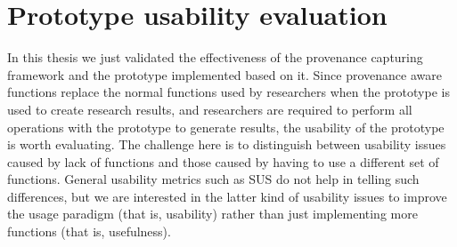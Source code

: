 \section{Prototype usability evaluation}
In this thesis we just validated the effectiveness of the provenance capturing framework and the prototype implemented based on it. Since provenance aware functions replace the normal functions used by researchers when the prototype is used to create research results, and researchers are required to perform all operations with the prototype to generate results, the usability of the prototype is worth evaluating. The challenge here is to distinguish between usability issues caused by lack of functions and those caused by having to use a different set of functions. General usability metrics such as SUS do not help in telling such differences, but we are interested in the latter kind of usability issues to improve the usage paradigm (that is, usability) rather than just implementing more functions (that is, usefulness). 


